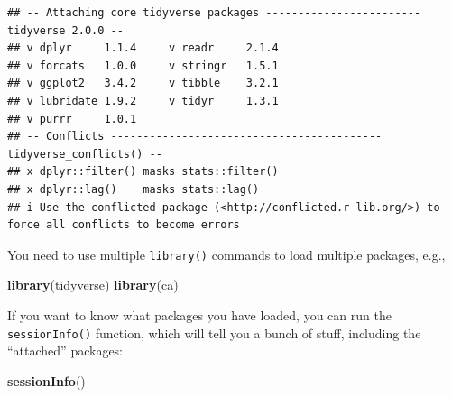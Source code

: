 \documentclass[
]{book}
\newenvironment{Shaded}{\begin{snugshade}}{\end{snugshade}}
\newcommand{\FunctionTok}[1]{\textcolor[rgb]{0.13,0.29,0.53}{\textbf{#1}}}
\newcommand{\NormalTok}[1]{#1}
\begin{document}
\begin{verbatim}
## -- Attaching core tidyverse packages ------------------------ tidyverse 2.0.0 --
## v dplyr     1.1.4     v readr     2.1.4
## v forcats   1.0.0     v stringr   1.5.1
## v ggplot2   3.4.2     v tibble    3.2.1
## v lubridate 1.9.2     v tidyr     1.3.1
## v purrr     1.0.1     
## -- Conflicts ------------------------------------------ tidyverse_conflicts() --
## x dplyr::filter() masks stats::filter()
## x dplyr::lag()    masks stats::lag()
## i Use the conflicted package (<http://conflicted.r-lib.org/>) to force all conflicts to become errors
\end{verbatim}

You need to use multiple \texttt{library()} commands to load multiple packages, e.g.,

\begin{Shaded}
\begin{Highlighting}[]
\FunctionTok{library}\NormalTok{(tidyverse)}
\FunctionTok{library}\NormalTok{(ca)}
\end{Highlighting}
\end{Shaded}

If you want to know what packages you have loaded, you can run the \texttt{sessionInfo()} function, which will tell you a bunch of stuff, including the ``attached'' packages:

\begin{Shaded}
\begin{Highlighting}[]
\FunctionTok{sessionInfo}\NormalTok{()}
\end{Highlighting}
\end{Shaded}
\end{document}
